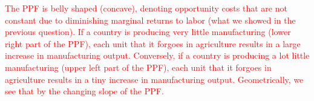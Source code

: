 \documentclass[11pt,letterpaper]{exam}
\newcommand{\red}[1]{\textcolor{red}{#1}}
\begin{document}
\begin{questions}
\begin{parts}
    

\red{
The PPF is belly shaped (concave), denoting opportunity costs that are not constant due to diminishing marginal returns to labor (what we showed in the previous question). If a country is producing very little manufacturing (lower right part of the PPF), each unit that it forgoes in agriculture results in a large increase in manufacturing output. Conversely, if a country is producing a lot little manufacturing (upper left part of the PPF), each unit that it forgoes in agriculture results in a tiny increase in manufacturing output. Geometrically, we see that by the changing slope of the PPF.
}


\end{parts}
\end{questions}
\end{document}
